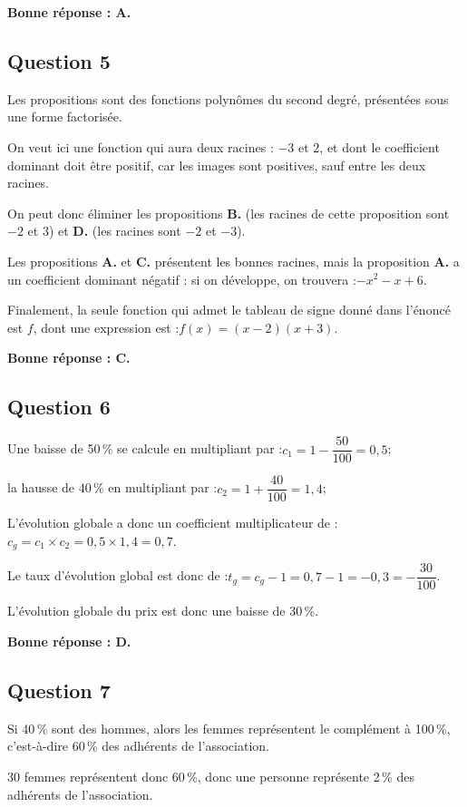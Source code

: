 	\textbf{Bonne réponse : A.}

\subsection*{Question 5}
	Les propositions sont des fonctions polynômes du second degré, présentées sous une forme factorisée.

	On veut ici une fonction qui aura deux racines : $-3$ et 2, et dont le coefficient dominant doit être positif, car les images sont positives, sauf entre les deux racines.

	On peut donc éliminer les propositions \textbf{B.} (les racines de cette proposition sont $-2$ et $3$) et \textbf{D.} (les racines sont $-2$ et $-3$).

	Les propositions \textbf{A.} et \textbf{C.} présentent les bonnes racines, mais la proposition \textbf{A.} a un coefficient dominant négatif : si on développe, on trouvera :\quad $-x^2 -x + 6$.

	Finalement, la seule fonction qui admet le tableau de signe donné dans l'énoncé est $f$, dont une expression est :\quad $f(x) = (x - 2)(x + 3)$.

	\textbf{Bonne réponse : C.}

\subsection*{Question 6}
	Une baisse de 50\,\% se calcule en multipliant par :\quad $c_1 = 1 - \dfrac{50}{100} = 0,5$;

	la hausse de 40\,\% en multipliant par :\quad $c_2 = 1 + \dfrac{40}{100} = 1,4$;

	L'évolution globale a donc un coefficient multiplicateur de :\quad $c_g = c_1  \times c_2 = 0,5 \times 1,4 = 0,7$.

	Le taux d'évolution global est donc de :\quad $t_g = c_g - 1 = 0,7 - 1 = -0,3 = -\dfrac{30}{100}$.

	L'évolution globale du prix est donc une baisse de 30\,\%.

	\textbf{Bonne réponse : D.}

\subsection*{Question 7}
	Si 40\,\% sont des hommes, alors les femmes représentent le complément à 100\,\%, c'est-à-dire 60\,\% des adhérents de l'association.

	30 femmes représentent donc 60\,\%, donc une personne représente 2\,\% des adhérents de l'association.

